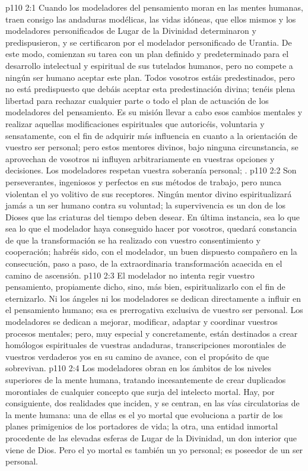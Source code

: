 \vs p110 2:1 Cuando los modeladores del pensamiento moran en las mentes humanas, traen consigo las andaduras modélicas, las vidas idóneas, que ellos mismos y los modeladores personificados de Lugar de la Divinidad determinaron y predispusieron, y se certificaron por el modelador personificado de Urantia. De este modo, comienzan su tarea con un plan definido y predeterminado para el desarrollo intelectual y espiritual de sus tutelados humanos, pero no compete a ningún ser humano aceptar este plan. Todos vosotros estáis predestinados, pero no está predispuesto que debáis aceptar esta predestinación divina; tenéis plena libertad para rechazar cualquier parte o todo el plan de actuación de los modeladores del pensamiento. Es su misión llevar a cabo esos cambios mentales y realizar aquellas modificaciones espirituales que autoricéis, voluntaria y sensatamente, con el fin de adquirir más influencia en cuanto a la orientación de vuestro ser personal; pero estos mentores divinos, bajo ninguna circunstancia, se aprovechan de vosotros ni influyen arbitrariamente en vuestras opciones y decisiones. Los modeladores respetan vuestra soberanía personal; .
\vs p110 2:2 Son perseverantes, ingeniosos y perfectos en sus métodos de trabajo, pero nunca violentan el yo volitivo de sus receptores. Ningún mentor divino espiritualizará jamás a un ser humano contra su voluntad; la supervivencia es un don de los Dioses que las criaturas del tiempo deben desear. En última instancia, sea lo que sea lo que el modelador haya conseguido hacer por vosotros, quedará constancia de que la transformación se ha realizado con vuestro consentimiento y cooperación; habréis sido, con el modelador, un buen dispuesto compañero en la consecución, paso a paso, de la extraordinaria transformación acaecida en el camino de ascensión.
\vs p110 2:3 \pc El modelador no intenta regir vuestro pensamiento, propiamente dicho, sino, más bien, espiritualizarlo con el fin de eternizarlo. Ni los ángeles ni los modeladores se dedican directamente a influir en el pensamiento humano; esa es prerrogativa exclusiva de vuestro ser personal. Los modeladores se dedican a mejorar, modificar, adaptar y coordinar vuestros procesos mentales; pero, muy especial y concretamente, están destinados a crear homólogos espirituales de vuestras andaduras, transcripciones morontiales de vuestros verdaderos yos en su camino de avance, con el propósito de que sobrevivan.
\vs p110 2:4 Los modeladores obran en los ámbitos de los niveles superiores de la mente humana, tratando incesantemente de crear duplicados morontiales de cualquier concepto que surja del intelecto mortal. Hay, por consiguiente, dos realidades que inciden, y se centran, en las vías circulatorias de la mente humana: una de ellas es el yo mortal que evoluciona a partir de los planes primigenios de los portadores de vida; la otra, una entidad inmortal procedente de las elevadas esferas de Lugar de la Divinidad, un don interior que viene de Dios. Pero el yo mortal es también un yo personal; es poseedor de un ser personal.
